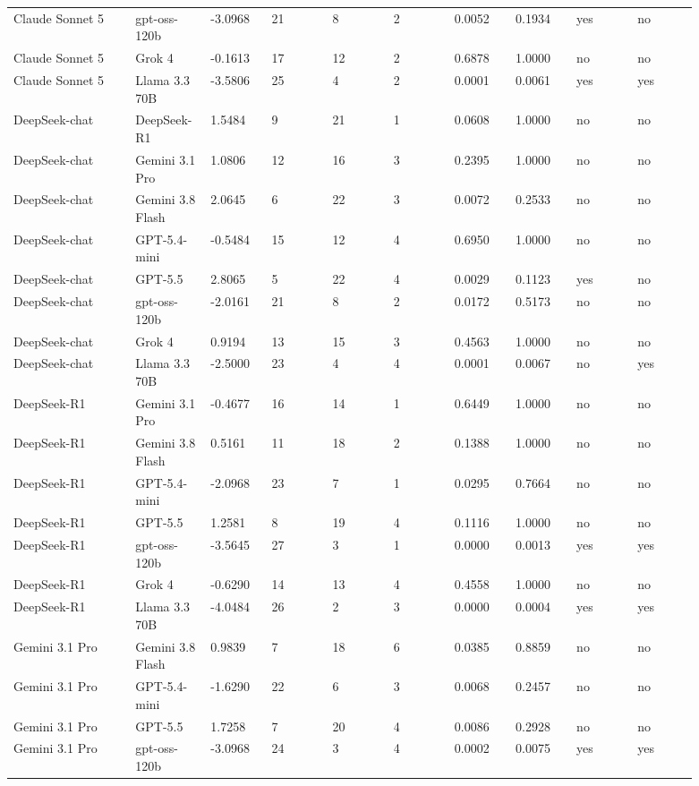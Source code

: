 \begin{landscape}
\begin{longtable}{p{0.162\linewidth}p{0.081\linewidth}p{0.081\linewidth}p{0.081\linewidth}p{0.081\linewidth}p{0.081\linewidth}p{0.081\linewidth}p{0.081\linewidth}p{0.081\linewidth}p{0.081\linewidth}}
Claude Sonnet 5 & gpt-oss-120b & -3.0968 & 21 & 8 & 2 & 0.0052 & 0.1934 & yes & no \\
Claude Sonnet 5 & Grok 4 & -0.1613 & 17 & 12 & 2 & 0.6878 & 1.0000 & no & no \\
Claude Sonnet 5 & Llama 3.3 70B & -3.5806 & 25 & 4 & 2 & 0.0001 & 0.0061 & yes & yes \\
DeepSeek-chat & DeepSeek-R1 & 1.5484 & 9 & 21 & 1 & 0.0608 & 1.0000 & no & no \\
DeepSeek-chat & Gemini 3.1 Pro & 1.0806 & 12 & 16 & 3 & 0.2395 & 1.0000 & no & no \\
DeepSeek-chat & Gemini 3.8 Flash & 2.0645 & 6 & 22 & 3 & 0.0072 & 0.2533 & no & no \\
DeepSeek-chat & GPT-5.4-mini & -0.5484 & 15 & 12 & 4 & 0.6950 & 1.0000 & no & no \\
DeepSeek-chat & GPT-5.5 & 2.8065 & 5 & 22 & 4 & 0.0029 & 0.1123 & yes & no \\
DeepSeek-chat & gpt-oss-120b & -2.0161 & 21 & 8 & 2 & 0.0172 & 0.5173 & no & no \\
DeepSeek-chat & Grok 4 & 0.9194 & 13 & 15 & 3 & 0.4563 & 1.0000 & no & no \\
DeepSeek-chat & Llama 3.3 70B & -2.5000 & 23 & 4 & 4 & 0.0001 & 0.0067 & no & yes \\
DeepSeek-R1 & Gemini 3.1 Pro & -0.4677 & 16 & 14 & 1 & 0.6449 & 1.0000 & no & no \\
DeepSeek-R1 & Gemini 3.8 Flash & 0.5161 & 11 & 18 & 2 & 0.1388 & 1.0000 & no & no \\
DeepSeek-R1 & GPT-5.4-mini & -2.0968 & 23 & 7 & 1 & 0.0295 & 0.7664 & no & no \\
DeepSeek-R1 & GPT-5.5 & 1.2581 & 8 & 19 & 4 & 0.1116 & 1.0000 & no & no \\
DeepSeek-R1 & gpt-oss-120b & -3.5645 & 27 & 3 & 1 & 0.0000 & 0.0013 & yes & yes \\
DeepSeek-R1 & Grok 4 & -0.6290 & 14 & 13 & 4 & 0.4558 & 1.0000 & no & no \\
DeepSeek-R1 & Llama 3.3 70B & -4.0484 & 26 & 2 & 3 & 0.0000 & 0.0004 & yes & yes \\
Gemini 3.1 Pro & Gemini 3.8 Flash & 0.9839 & 7 & 18 & 6 & 0.0385 & 0.8859 & no & no \\
Gemini 3.1 Pro & GPT-5.4-mini & -1.6290 & 22 & 6 & 3 & 0.0068 & 0.2457 & no & no \\
Gemini 3.1 Pro & GPT-5.5 & 1.7258 & 7 & 20 & 4 & 0.0086 & 0.2928 & no & no \\
Gemini 3.1 Pro & gpt-oss-120b & -3.0968 & 24 & 3 & 4 & 0.0002 & 0.0075 & yes & yes \\

\end{longtable}
\end{landscape}
